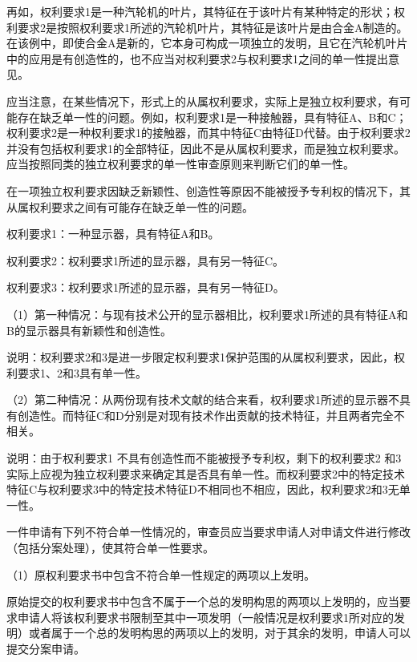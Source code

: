 再如，权利要求1是一种汽轮机的叶片，其特征在于该叶片有某种特定的形状；权利要求2是按照权利要求1所述的汽轮机叶片，其特征是该叶片是由合金A制造的。在该例中，即使合金A是新的，它本身可构成一项独立的发明，且它在汽轮机叶片中的应用是有创造性的，也不应当对权利要求2与权利要求1之间的单一性提出意见。

应当注意，在某些情况下，形式上的从属权利要求，实际上是独立权利要求，有可能存在缺乏单一性的问题。例如，权利要求1是一种接触器，具有特征A、B和C；权利要求2是一种权利要求1的接触器，而其中特征C由特征D代替。由于权利要求2并没有包括权利要求1的全部特征，因此不是从属权利要求，而是独立权利要求。应当按照同类的独立权利要求的单一性审查原则来判断它们的单一性。

在一项独立权利要求因缺乏新颖性、创造性等原因不能被授予专利权的情况下，其从属权利要求之间有可能存在缺乏单一性的问题。

{\par}

权利要求1：一种显示器，具有特征A和B。

权利要求2：权利要求1所述的显示器，具有另一特征C。

权利要求3：权利要求1所述的显示器，具有另一特征D。

{\setlength{\parindent}{17.1bp}（1）第一种情况：与现有技术公开的显示器相比，权利要求1所述的具有特征A和B的显示器具有新颖性和创造性。\par}

说明：权利要求2和3是进一步限定权利要求1保护范围的从属权利要求，因此，权利要求1、2和3具有单一性。

{\setlength{\parindent}{17.1bp}（2）第二种情况：从两份现有技术文献的结合来看，权利要求1所述的显示器不具有创造性。而特征C和D分别是对现有技术作出贡献的技术特征，并且两者完全不相关。\par}

说明：由于权利要求1 不具有创造性而不能被授予专利权，剩下的权利要求2 和3 实际上应视为独立权利要求来确定其是否具有单一性。而权利要求2中的特定技术特征C与权利要求3中的特定技术特征D不相同也不相应，因此，权利要求2和3无单一性。

一件申请有下列不符合单一性情况的，审查员应当要求申请人对申请文件进行修改（包括分案处理），使其符合单一性要求。

{\setlength{\parindent}{17.1bp}（1）原权利要求书中包含不符合单一性规定的两项以上发明。\par}

原始提交的权利要求书中包含不属于一个总的发明构思的两项以上发明的，应当要求申请人将该权利要求书限制至其中一项发明（一般情况是权利要求1所对应的发明）或者属于一个总的发明构思的两项以上的发明，对于其余的发明，申请人可以提交分案申请。

